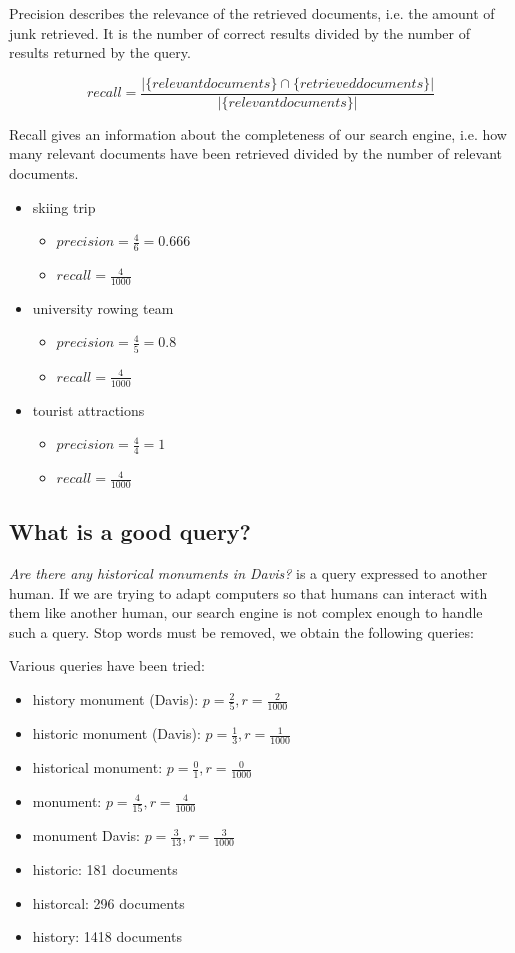Precision describes the relevance of the retrieved documents, i.e. the amount of junk retrieved. It is the number of correct results divided by the number of results returned by the query.

\begin{equation}
recall = \frac{|\{relevant documents\}\cap\{retrieved documents\}|}{|\{relevant documents\}|}
\end{equation}

Recall gives an information about the completeness of our search engine, i.e. how many relevant documents have been retrieved divided by the number of relevant documents.

\begin{itemize}
    \item skiing trip
    \begin{itemize}
        \item $ precision = \frac{4}{6} = 0.666 $
        \item $ recall = \frac{4}{1000} $
    \end{itemize}
    \item university rowing team
    \begin{itemize}
        \item $ precision = \frac{4}{5} = 0.8 $
        \item $ recall = \frac{4}{1000} $
    \end{itemize}
    \item tourist attractions
    \begin{itemize}
        \item $ precision = \frac{4}{4} = 1 $
        \item $ recall = \frac{4}{1000} $
    \end{itemize}
\end{itemize}


\subsection{What is a good query?}
\textit{Are there any historical monuments in Davis?} is a query expressed to another human. If we are trying to adapt computers so that humans can interact with them like another human, our search engine is not complex enough to handle such a query. Stop words must be removed, we obtain the following queries:

Various queries have been tried:
\begin{itemize}
\item history monument (Davis): $ p = \frac{2}{5}, r = \frac{2}{1000} $
\item historic monument (Davis): $ p = \frac{1}{3}, r = \frac{1}{1000} $
\item historical monument: $ p = \frac{0}{1}, r = \frac{0}{1000} $
\item monument: $ p = \frac{4}{15}, r = \frac{4}{1000} $
\item monument Davis: $ p = \frac{3}{13}, r = \frac{3}{1000} $
\item historic: 181 documents
\item historcal: 296 documents
\item history: 1418 documents
\end{itemize}

